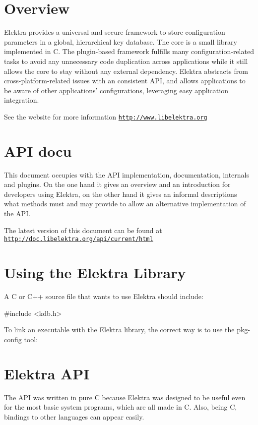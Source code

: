 \hypertarget{index_overview}{}\section{Overview}\label{index_overview}
Elektra provides a universal and secure framework to store configuration parameters in a global, hierarchical key database. The core is a small library implemented in C. The plugin-\/based framework fulfills many configuration-\/related tasks to avoid any unnecessary code duplication across applications while it still allows the core to stay without any external dependency. Elektra abstracts from cross-\/platform-\/related issues with an consistent API, and allows applications to be aware of other applications' configurations, leveraging easy application integration.

See the website for more information \href{http://www.libelektra.org}{\tt http://www.libelektra.org}\hypertarget{index_focus}{}\section{API docu}\label{index_focus}
This document occupies with the API implementation, documentation, internals and plugins. On the one hand it gives an overview and an introduction for developers using Elektra, on the other hand it gives an informal descriptions what methods must and may provide to allow an alternative implementation of the API.

The latest version of this document can be found at \href{http://doc.libelektra.org/api/current/html}{\tt http://doc.libelektra.org/api/current/html}\hypertarget{index_using}{}\section{Using the Elektra Library}\label{index_using}
A C or C++ source file that wants to use Elektra should include: 
\begin{DoxyCode}
 #include <kdb.h>
\end{DoxyCode}


To link an executable with the Elektra library, the correct way is to use the {\ttfamily pkg-\/config} tool: 
\hypertarget{index_classes}{}\section{Elektra API}\label{index_classes}
The API was written in pure C because Elektra was designed to be useful even for the most basic system programs, which are all made in C. Also, being C, bindings to other languages can appear easily.

